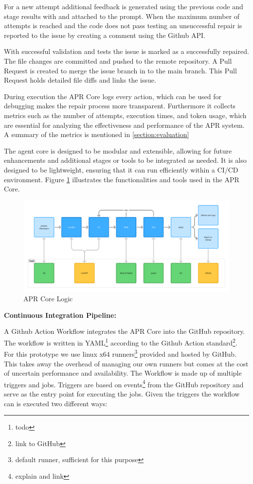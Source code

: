 For a new attempt additional feedback is generated using the previous code and stage results with and attached to the prompt. When the maximum number of attempts is reached and the code does not pass testing an unsuccessful repair is reported to the issue by creating a comment using the Github API.

With successful validation and tests the issue is marked as a successfully repaired. The file changes are committed and pushed to the remote repository. A Pull Request is created to merge the issue branch in to the main branch. This Pull Request holds detailed file diffs and links the issue.

During execution the APR Core logs every action, which can be used for debugging makes the repair process more transparent. Furthermore it collects metrics such as the number of attempts, execution times, and token usage, which are essential for analyzing the effectiveness and performance of the APR system. A summary of the metrics is mentioned in \ref{section:evaluation}

The agent core is designed to be modular and extensible, allowing for future enhancements and additional stages or tools to be integrated as needed. It is also designed to be lightweight, ensuring that it can run efficiently within a CI/CD environment. Figure \ref{fig:apr-core} illustrates the functionalities and tools used in the APR Core.

\begin{figure}[H]
    \centering
    \includegraphics[width=1\textwidth]{images/flowcharts/apr-core.png}
    \caption{APR Core Logic}
    \label{fig:apr-core}
\end{figure}

\textbf{Continuous Integration Pipeline:}

A Github Action Workflow integrates the APR Core into the GitHub repository. The workflow is written in YAML\footnote{todo} according to the Github Action standard\footnote{link to GitHub}.
For this prototype we use linux x64 runners\footnote{default runner, sufficient for this purpose} provided and hosted by GitHub. This takes away the overhead of managing our own runners but comes at the cost of uncertain performance and availability. %
The Workflow is made up of multiple triggers and jobs. Triggers are based on events\footnote{explain and link} from the GitHub repository and serve as the entry point for executing the jobs. Given the triggers the workflow can is executed two different ways:

